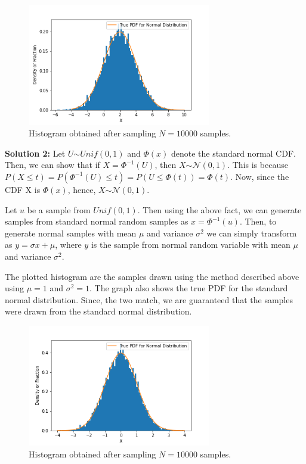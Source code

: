 \documentclass{article}
\begin{document}
\begin{enumerate}
	\noindent %
    \begin{figure}[H]
        \begin{center}
        \includegraphics[width=8cm]{Q2_1.png}
        \end{center}
        \caption{Histogram obtained after sampling $N=10000$ samples.}
    \end{figure} 
    \textbf{Solution 2:}
    Let $U \stackrel{}{\sim} Unif(0, 1)$ and $\Phi(x)$ denote the standard normal CDF. Then, we can show that if $X = \Phi^{-1}(U)$,
    then $X \stackrel{}{\sim} \mathcal{N}(0, 1)$. This is because $P(X \le t) = P(\Phi^{-1}(U) \le t) = P(U \le \Phi(t)) = \Phi(t)$. Now,
    since the CDF X is $\Phi(x)$, hence, $X \stackrel{}{\sim} \mathcal{N}(0, 1)$. \par
	
	\noindent %
    Let $u$ be a sample from $Unif(0, 1)$. Then using the above fact, we can generate samples from standard normal random samples as 
    $x =\Phi^{-1}(u)$. Then, to generate normal samples with mean $\mu$ and variance $\sigma^{2}$ we can simply transform as 
    $y = \sigma x + \mu$, where $y$ is the sample from normal random variable with mean $\mu$ and variance $\sigma^{2}$.\par
	
	\noindent %
    The plotted histogram are the samples drawn using the method described above using $\mu=1$ and $\sigma^{2}=1$. The graph also shows
    the true PDF for the standard normal distribution. Since, the two match, we are guaranteed that the samples were drawn from the
    standard normal distribution.

    \begin{figure}[H]
        \begin{center}
        \includegraphics[width=8cm]{Q2.png}
        \end{center}
        \caption{Histogram obtained after sampling $N=10000$ samples.}
    \end{figure}


\end{enumerate}
\end{document}
